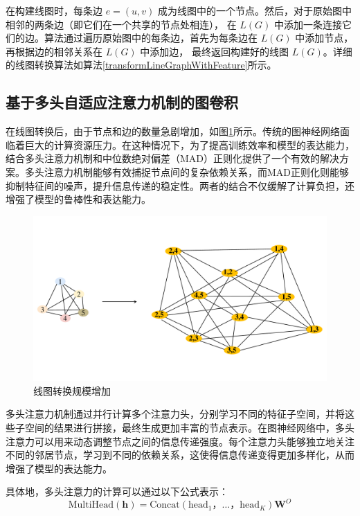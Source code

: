 \documentclass[promaster]{thesis-uestc}
\begin{document}
    
在构建线图时，每条边 $e = (u, v)$ 成为线图中的一个节点。然后，对于原始图中相邻的两条边（即它们在一个共享的节点处相连），
在 $L(G)$ 中添加一条连接它们的边。算法通过遍历原始图中的每条边，首先为每条边在 $L(G)$ 中添加节点，再根据边的相邻关系在 $L(G)$ 中添加边，
最终返回构建好的线图 $L(G)$。详细的线图转换算法如算法\ref{transformLineGraphWithFeature}所示。


\subsection{基于多头自适应注意力机制的图卷积}
在线图转换后，由于节点和边的数量急剧增加，如图\ref{largeLine}所示。传统的图神经网络面临着巨大的计算资源压力。在这种情况下，为了提高训练效率和模型的表达能力，结合多头注意力机制和中位数绝对偏差（MAD）正则化提供了一个有效的解决方案。多头注意力机制能够有效捕捉节点间的复杂依赖关系，而MAD正则化则能够抑制特征间的噪声，提升信息传递的稳定性。两者的结合不仅缓解了计算负担，还增强了模型的鲁棒性和表达能力。
\begin{figure}[h!]
    \centering
    \includegraphics[width=1\linewidth]{./pic/线图转换维度增加.pdf}
    \caption{线图转换规模增加}
    \label{largeLine}
\end{figure}

多头注意力机制通过并行计算多个注意力头，分别学习不同的特征子空间，并将这些子空间的结果进行拼接，最终生成更加丰富的节点表示。在图神经网络中，多头注意力可以用来动态调整节点之间的信息传递强度。每个注意力头能够独立地关注不同的邻居节点，学习到不同的依赖关系，这使得信息传递变得更加多样化，从而增强了模型的表达能力。

具体地，多头注意力的计算可以通过以下公式表示：
\begin{equation}
\text{MultiHead}(\mathbf{h}) = \text{Concat}\left( \text{head}_1， \dots， \text{head}_K \right) \mathbf{W}^O
\end{equation}
\end{document}
